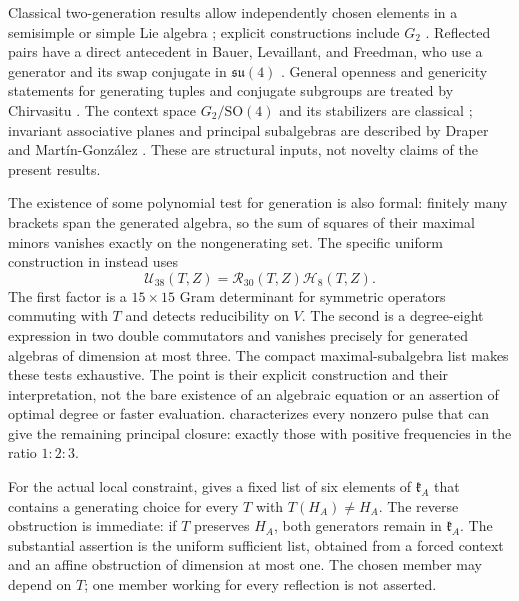 \documentclass[11pt,a4paper]{article}
\newcommand{\SO}{\mathrm{SO}}
\begin{document}
Classical two-generation results allow independently chosen elements in a semisimple or simple Lie algebra \cite{Kuranishi1951,AlbuquerqueSilvaLeite1989,Bois2009}; explicit constructions include $G_2$ \cite{DetinkoDeGraaf2020}.
Reflected pairs have a direct antecedent in Bauer, Levaillant, and Freedman, who use a generator and its swap conjugate in $\mathfrak{su}(4)$ \cite{BauerLevaillantFreedman2014}.
General openness and genericity statements for generating tuples and conjugate subgroups are treated by Chirvasitu \cite{Chirvasitu2021}.
The context space $G_2/\SO(4)$ and its stabilizers are classical \cite{HarveyLawson1982,Cacciatori2005,KnarrStroppel2025}; invariant associative planes and principal subalgebras are described by Draper and Mart\'in-Gonz\'alez \cite{DraperMartin2025}.
These are structural inputs, not novelty claims of the present results.

The existence of some polynomial test for generation is also formal: finitely many brackets span the generated algebra, so the sum of squares of their maximal minors vanishes exactly on the nongenerating set.
The specific uniform construction in  instead uses
\[
\mathcal U_{38}(T,Z)=\mathcal R_{30}(T,Z)\mathcal H_8(T,Z).
\]
The first factor is a $15\times15$ Gram determinant for symmetric operators commuting with $T$ and detects reducibility on $V$.  The second is a degree-eight expression in two double commutators and vanishes precisely for generated algebras of dimension at most three.
The compact maximal-subalgebra list makes these tests exhaustive.
The point is their explicit construction and their interpretation, not the bare existence of an algebraic equation or an assertion of optimal degree or faster evaluation.
 characterizes every nonzero pulse that can give the remaining principal closure: exactly those with positive frequencies in the ratio $1:2:3$.

For the actual local constraint,  gives a fixed list of six elements of $\mathfrak k_A$ that contains a generating choice for every $T$ with $T(H_A)\ne H_A$.
The reverse obstruction is immediate: if $T$ preserves $H_A$, both generators remain in $\mathfrak k_A$.
The substantial assertion is the uniform sufficient list, obtained from a forced context and an affine obstruction of dimension at most one.
The chosen member may depend on $T$; one member working for every reflection is not asserted.
\end{document}
